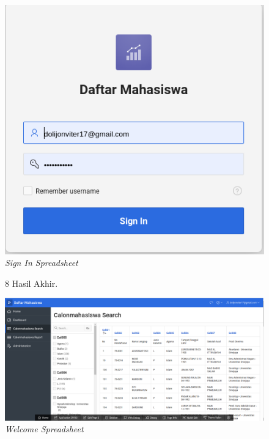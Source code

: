 \begin{enumerate}
\begin{figure}
    \begin{center}
\includegraphics[scale=0.4]{figures/loginMhs.png}
    \caption{\textit{Sign In Spreadsheet}}
        \end{center}
\label{gambar}
\end{figure}

\begin{figure}
\item[8]Hasil Akhir.

    \begin{center}
\includegraphics[scale=0.3]{figures/mhs1.png}
    \caption{\textit{Welcome Spreadsheet}}
        \end{center}
\label{gambar}
\end{figure}

\end{enumerate}




    

